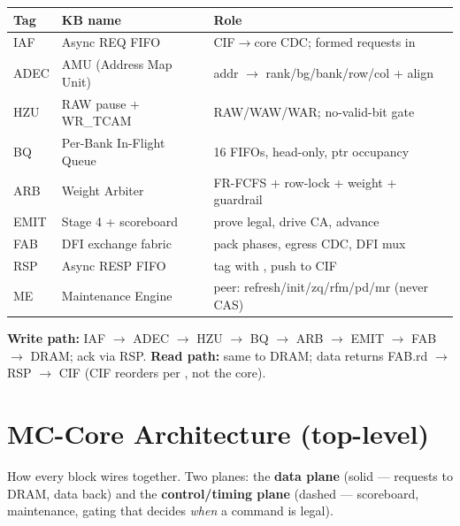 \documentclass[11pt]{report}
\newcommand{\sig}[1]{\texttt{\detokenize{#1}}}
\begin{document}
\begin{center}\begin{tabular}{@{}llL{6.4cm}@{}}\toprule
Tag & KB name & Role \\ \midrule
IAF & Async REQ FIFO & CIF$\to$core CDC; formed requests in \\
ADEC & AMU (Address Map Unit) & addr $\to$ rank/bg/bank/row/col + align \\
HZU & RAW pause + WR\_TCAM & RAW/WAW/WAR; no-valid-bit gate \\
BQ & Per-Bank In-Flight Queue & 16 FIFOs, head-only, ptr occupancy \\
ARB & Weight Arbiter & FR-FCFS + row-lock + weight + guardrail \\
EMIT & Stage 4 + scoreboard & prove legal, drive CA, advance \sig{next_*} \\
FAB & DFI exchange fabric & pack phases, egress CDC, DFI mux \\
RSP & Async RESP FIFO & tag with \sig{id}, push to CIF \\
ME & Maintenance Engine & peer: refresh/init/zq/rfm/pd/mr (never CAS) \\ \bottomrule
\end{tabular}\end{center}

\textbf{Write path:} IAF $\to$ ADEC $\to$ HZU $\to$ BQ $\to$ ARB $\to$ EMIT $\to$ FAB $\to$
DRAM; ack via RSP. \textbf{Read path:} same to DRAM; data returns FAB.rd $\to$ RSP $\to$
CIF (CIF reorders per \sig{id}, not the core).

\chapter{MC-Core Architecture (top-level)}

How every block wires together. Two planes: the \textbf{data plane} (solid --- requests to
DRAM, data back) and the \textbf{control/timing plane} (dashed --- scoreboard, maintenance,
gating that decides \emph{when} a command is legal).
\end{document}
